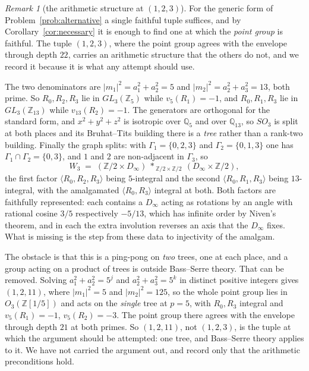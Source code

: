 \documentclass[11pt]{article}
\theoremstyle{definition}
\theoremstyle{remark}
\newtheorem{remark}[theorem]{Remark}
\theoremstyle{definition}
\newcommand{\Z}{\mathbb{Z}}
\newcommand{\Q}{\mathbb{Q}}
\begin{document}
\begin{remark}[the arithmetic structure at $(1,2,3)$]\label{rem:pingpong}
For the generic form of Problem~\ref{prob:alternative} a single faithful tuple suffices, and
by Corollary~\ref{cor:necessary} it is enough to find one at which the \emph{point group} is
faithful. The tuple $(1,2,3)$, where the point group agrees with the envelope through depth $22$,
carries an arithmetic structure that the others do not, and we record it because it is what any
attempt should use.

The two denominators are $|m_1|^2=a_1^2+a_2^2=5$ and $|m_2|^2=a_2^2+a_3^2=13$, both prime. So
$R_0,R_2,R_3$ lie in $GL_3(\Z_5)$ while $v_5(R_1)=-1$, and $R_0,R_1,R_3$ lie in $GL_3(\Z_{13})$
while $v_{13}(R_2)=-1$. The generators are orthogonal for the standard form, and
$x^2+y^2+z^2$ is isotropic over $\Q_5$ and over $\Q_{13}$, so $SO_3$ is split at both places and
its Bruhat--Tits building there is a \emph{tree} rather than a rank-two building. Finally the
graph splits: with $\Gamma_1=\{0,2,3\}$ and $\Gamma_2=\{0,1,3\}$ one has
$\Gamma_1\cap\Gamma_2=\{0,3\}$, and $1$ and $2$ are non-adjacent in $\Gamma_3$, so
\[
 W_3\;=\;(\Z/2\times D_\infty)\ \ast_{\ \Z/2\times\Z/2}\ (D_\infty\times\Z/2),
\]
the first factor $\langle R_0,R_2,R_3\rangle$ being $5$-integral and the second
$\langle R_0,R_1,R_3\rangle$ being $13$-integral, with the amalgamated
$\langle R_0,R_3\rangle$ integral at both. Both factors are faithfully represented: each contains
a $D_\infty$ acting as rotations by an angle with rational cosine $3/5$ respectively $-5/13$,
which has infinite order by Niven's theorem, and in each the extra involution reverses an axis
that the $D_\infty$ fixes. What is missing is the step from these data to injectivity of the
amalgam.

The obstacle is that this is a ping-pong on \emph{two} trees, one at each place, and a group
acting on a product of trees is outside Bass--Serre theory. That can be removed. Solving
$a_1^2+a_2^2=5^j$ and $a_2^2+a_3^2=5^k$ in distinct positive integers gives $(1,2,11)$, where
$|m_1|^2=5$ and $|m_2|^2=125$, so the whole point group lies in $O_3(\Z[1/5])$ and acts on the
\emph{single} tree at $p=5$, with $R_0,R_3$ integral and $v_5(R_1)=-1$, $v_5(R_2)=-3$. The point
group there agrees with the envelope through depth $21$ at both primes. So $(1,2,11)$, not
$(1,2,3)$, is the tuple at which the argument should be attempted: one tree, and Bass--Serre
theory applies to it. We have not carried the argument out, and record only that the arithmetic
preconditions hold.
\end{remark}
\end{document}
